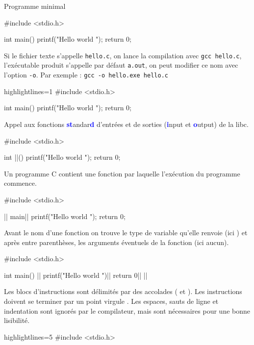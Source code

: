 \documentclass[10pt]{beamer}
\begin{document}
\begin{frame}[fragile]{\Ctitle}{\stitle}
	\begin{exampleblock}{Programme minimal}
		\begin{overprint}
			\begin{langageC}
				#include <stdio.h>

				int main()
				{
						printf("Hello world \n");
						return 0;
					}
			\end{langageC}
			\medskip
			Si le fichier texte s'appelle {\tt hello.c}, on lance la compilation avec {\tt gcc hello.c}, l'exécutable produit s'appelle par défaut {\tt a.out}, on peut modifier ce nom avec l'option {\tt -o}. Par exemple : {\tt gcc -o hello.exe hello.c}
			\onslide<2>
			\begin{langageC*}{highlightlines=1}
				#include <stdio.h>

				int main()
				{
						printf("Hello world \n");
						return 0;
					}
			\end{langageC*}
			\medskip
			Appel aux fonctions \textcolor{blue}{\textbf{st}}andar\textcolor{blue}{\textbf d} d'entrées et de sorties (\textcolor{blue}{\textbf i}nput et \textcolor{blue}{\textbf o}utput)  de la libc.
			\onslide<3>
			\begin{langageC}
				#include <stdio.h>

				int |\myem{main}|()
				{
						printf("Hello world \n");
						return 0;
					}
			\end{langageC}
			\medskip
			Un programme C contient une fonction  par laquelle l'exécution du programme commence.
			\onslide<4>
			\begin{langageC}
				#include <stdio.h>

				|| main|\myem{()}|
				{
				printf("Hello world \n");
				return 0;
				}
			\end{langageC}
			\medskip
			Avant le nom d'une fonction on trouve le type de variable qu'elle renvoie (ici ) et après entre parenthèses, les arguments éventuels de la fonction (ici aucun).
			\onslide<5>
			\begin{langageC}
				#include <stdio.h>

				int main()
				|\myem{\{}|
				printf("Hello world \n")|\myem{;}|
				return 0|\myem{;}|
				|\myem{\}}|
			\end{langageC}
			\medskip
			Les blocs d'instructions sont délimités par des accolades (\kw{ \{} et \kw{ \}}). Les instructions doivent se terminer par un point virgule \kw{ ;}. Les espaces, sauts de ligne et indentation sont ignorés par le compilateur, mais sont nécessaires pour une bonne lisibilité.
			\onslide<6>
			\begin{langageC*}{highlightlines=5}
				#include <stdio.h>


\end{langageC*}
\end{overprint}
\end{exampleblock}
\end{frame}
\end{document}
